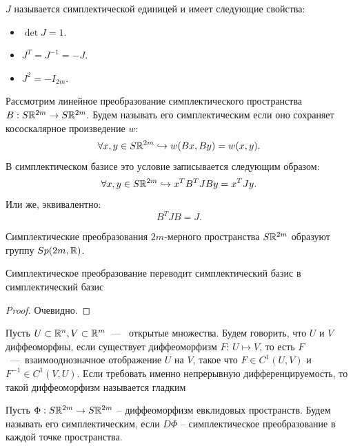 \begin{note}
    $J$ называется симплектической единицей и имеет следующие свойства:
    \begin{itemize}
        \item $\det J = 1$.
        \item $J^T = J^{-1} = -J$.
        \item $J^2 = -I_{2m}$.
    \end{itemize}
\end{note}
\begin{definition}
    Рассмотрим линейное преобразование симплектического пространства $B: S\mathbb{R}^{2m} \to S\mathbb{R}^{2m}$.
    Будем называть его симплектическим если оно сохраняет кососкалярное произведение $w$:
    \[
        \forall x, y \in S\mathbb{R}^{2m} \hookrightarrow w(Bx, By) = w(x, y).
    \]
    В симплектическом базисе это условие записывается следующим образом:
    \[
        \forall x, y \in S\mathbb{R}^{2m} \hookrightarrow x^{T}B^T J B y = x^T J y.
    \]
    Или же, эквивалентно:
    \[
        B^{T}J B = J.
    \]
\end{definition}
\begin{note}
    Симплектические преобразования $2m$-мерного пространства $S\mathbb{R}^{2m}$ образуют группу $Sp(2m, \mathbb{R})$.
\end{note}
\begin{theorem}
    Симплектическое преобразование переводит симплектический базис в симплектический базис
\end{theorem}
\begin{proof}
    Очевидно.
\end{proof}
\begin{reminder}
    Пусть $U \subset \mathbb{R}^n, V \subset \mathbb{R}^m$~---~ открытые множества. Будем говорить, что $U$ и $V$ диффеоморфны, если существует диффеоморфизм $F$: $U \mapsto V$, то есть $F$~---~взаимооднозначное отображение $U$ на $V$, такое что $F \in C^1(U, V)$ и  $F^{-1} \in C^1(V, U)$. Если требовать именно непрерывную дифференцируемость, то такой диффеоморфизм называется гладким
\end{reminder}
\begin{definition}
    Пусть $\Phi: S\mathbb{R}^{2m} \to S\mathbb{R}^{2m}$ -- диффеоморфизм евклидовых пространств.
    Будем называть его симплектическим, если $D\Phi$ -- симплектическое преобразование в каждой точке пространства.
\end{definition}
